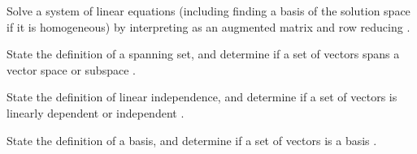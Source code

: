 \begin{readinessAssuranceOutcomes}
\item Solve a system of linear equations (including finding a basis of the solution space if it is homogeneous) by interpreting as an augmented matrix and row reducing .
\item State the definition of a spanning set, and determine if a set of vectors spans a vector space or subspace .
\item State the definition of linear independence, and determine if a set of vectors is linearly dependent or independent .
\item State the definition of a basis, and determine if a set of vectors is a basis .
\end{readinessAssuranceOutcomes}
